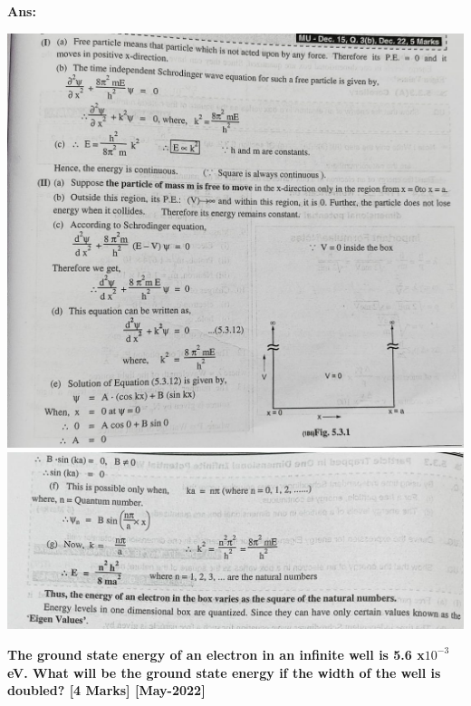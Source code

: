 \documentclass{exam}
\begin{document}
\begin{questions}
\textbf{Ans:} 
\begin{center}
	\includegraphics[scale=0.33]{Q14-1.jpeg}
	\includegraphics[scale=0.35]{Q14-2.jpeg}
\end{center}

\newpage
\question \textbf{The ground state energy of an electron in an infinite well is 5.6 x$10^{-3}$ eV. What will be the ground state energy if the width of the well is doubled?  \hfil[4 Marks] [May-2022] }


\end{questions}
\end{document}

